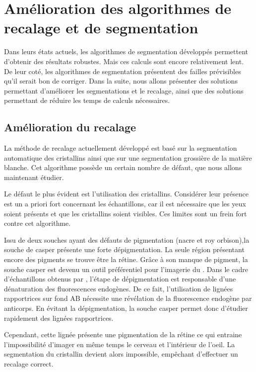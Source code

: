 \documentclass[\main/main.tex]{subfiles}
\begin{document}
                    
\section{Amélioration des algorithmes de recalage et de segmentation}

%
Dans leurs états actuels, les algorithmes de segmentation développés permettent d'obtenir des résultats robustes.
%
Mais ces calculs sont encore relativement lent.
%
De leur coté,
les algorithmes de segmentation présentent des failles prévisibles qu'il serait bon
de corriger.
%
Dans la suite,
nous allons présenter des solutions permettant d'améliorer les segmentations et le recalage,
ainsi que des solutions permettant de réduire les temps de calculs nécessaires.

    \subsection{Amélioration du recalage}
 
%   
La méthode de recalage actuellement développé est basé sur la segmentation automatique des cristallins ainsi que sur une segmentation grossière de la matière blanche.
%
Cet algorithme possède un certain nombre de défaut, que nous allons maintenant étudier.

%
Le défaut le plus évident est l'utilisation des cristallins.
%
Considérer leur présence est un a priori fort concernant les échantillons, car il est nécessaire que les yeux soient présents et que les cristallins soient visibles.
%
Ces limites sont un frein fort contre cet algorithme.

%
Issu de deux souches ayant des défauts de pigmentation (nacre et roy orbison),la souche de \pz{} casper présente une forte dépigmentation\cite{white_2008}.
%
La seule région présentant encore des pigments se trouve être la rétine.
%
Grâce à son manque de pigment, la souche casper est devenu un outil préférentiel pour l'imagerie du \pz\cite{hecker_2020,camiolo_2020, wertman_2020}.
%
Dans le cadre d'échantillons obtenus par \ihcie{}, l'étape de dépigmentation est responsable d'une dénaturation des fluorescences endogènes.
%
De ce fait, l'utilisation de lignées rapportrices sur fond AB nécessite une révélation de la fluorescence endogène par anticorps.
%
En évitant la dépigmentation, la souche casper permet donc d'étudier rapidement des lignées rapportrices.

Cependant, cette lignée présente une pigmentation de la rétine
ce qui entraine l'impossibilité d'imager en même temps le cerveau et l'intérieur de l'oeil.
%
La segmentation du cristallin devient alors impossible, empêchant d'effectuer un recalage correct.
\end{document}
